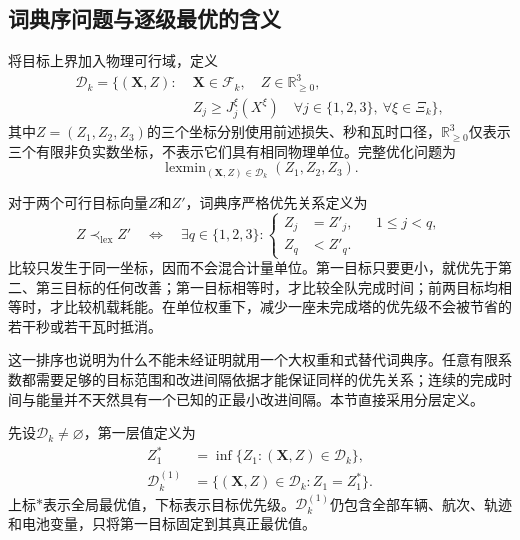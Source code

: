 \subsection{词典序问题与逐级最优的含义}

将目标上界加入物理可行域，定义
\begin{equation}
 \begin{aligned}
 \mathcal D_k=\bigl\{(\mathbf X,Z):\;&
 \mathbf X\in\mathcal F_k,\quad Z\in\mathbb R_{\ge0}^3,\\
 &Z_j\ge J_j^\xi(X^\xi)
 \quad\forall j\in\{1,2,3\},\ \forall\xi\in\Xi_k\bigr\},
 \end{aligned}
 \label{s0508:epigraph_domain}
\end{equation}
其中$Z=(Z_1,Z_2,Z_3)$的三个坐标分别使用前述损失、秒和瓦时口径，$\mathbb R_{\ge0}^3$仅表示三个有限非负实数坐标，不表示它们具有相同物理单位。完整优化问题为
\begin{equation}
 \operatorname{lexmin}_{(\mathbf X,Z)\in\mathcal D_k}
       (Z_1,Z_2,Z_3).
 \label{s0508:joint_lexicographic_problem}
\end{equation}

对于两个可行目标向量$Z$和$Z'$，词典序严格优先关系定义为
\begin{equation}
 Z\prec_{\mathrm{lex}}Z'
 \quad\Longleftrightarrow\quad
 \exists q\in\{1,2,3\}:
 \left\{
 \begin{aligned}
 Z_j&=Z'_j,&&1\le j<q,\\
 Z_q&<Z'_q.&
 \end{aligned}
 \right.
 \label{s0508:lexicographic_order}
\end{equation}
比较只发生于同一坐标，因而不会混合计量单位。第一目标只要更小，就优先于第二、第三目标的任何改善；第一目标相等时，才比较全队完成时间；前两目标均相等时，才比较机载耗能。在单位权重下，减少一座未完成塔的优先级不会被节省的若干秒或若干瓦时抵消。

这一排序也说明为什么不能未经证明就用一个大权重和式替代词典序。任意有限系数都需要足够的目标范围和改进间隔依据才能保证同样的优先关系；连续的完成时间与能量并不天然具有一个已知的正最小改进间隔。本节直接采用分层定义。

先设$\mathcal D_k\ne\varnothing$，第一层值定义为
\begin{align}
 Z_1^*&=\inf\{Z_1:(\mathbf X,Z)\in\mathcal D_k\},
 \label{s0508:first_optimum}\\
 \mathcal D_k^{(1)}
 &=\{(\mathbf X,Z)\in\mathcal D_k:Z_1=Z_1^*\}.
 \label{s0508:first_optimal_domain}
\end{align}
上标$*$表示全局最优值，下标表示目标优先级。$\mathcal D_k^{(1)}$仍包含全部车辆、航次、轨迹和电池变量，只将第一目标固定到其真正最优值。

